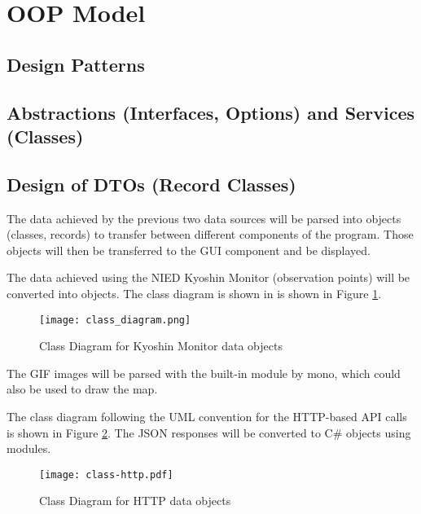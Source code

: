 

\section{OOP Model}

\subsection{Design Patterns}

\subsection{Abstractions (Interfaces, Options) and Services (Classes)}

\subsection{Design of DTOs (Record Classes)}



The data achieved by the previous two data sources will be parsed into objects (classes, records) to transfer between different components of the program. Those objects will then be transferred to the GUI component and be displayed.

The data achieved using the NIED Kyoshin Monitor (observation points) will be converted into objects. The class diagram is shown in is shown in Figure \ref{fig:classes-kmoni}.

\begin{figure}[htp]
    \centering
    \texttt{[image: class\_diagram.png]}
    \caption{Class Diagram for Kyoshin Monitor data objects}
    \label{fig:classes-kmoni}
\end{figure}

The GIF images will be parsed with the built-in  module by mono, which could also be used to draw the map.

The class diagram following the UML convention for the HTTP-based API calls is shown in Figure \ref{fig:classes-http}. The JSON responses will be converted to C\# objects using  modules.

\begin{figure}[htp]
    \centering
    \texttt{[image: class-http.pdf]}
    \caption{Class Diagram for HTTP data objects}
    \label{fig:classes-http}
\end{figure}

